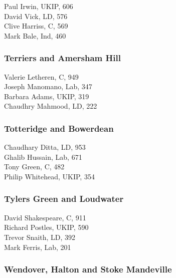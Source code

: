 \documentclass[a4paper,openany,10pt]{book}
\begin{document}


Paul Irwin, UKIP, 606\\
David Vick, LD, 576\\
Clive Harriss, C, 569\\
Mark Bale, Ind, 460\\


\subsubsection*{Terriers and Amersham Hill}



Valerie Letheren, C, 949\\
Joseph Manomano, Lab, 347\\
Barbara Adams, UKIP, 319\\
Chaudhry Mahmood, LD, 222\\


\subsubsection*{Totteridge and Bowerdean}



Chaudhary Ditta, LD, 953\\
Ghalib Hussain, Lab, 671\\
Tony Green, C, 482\\
Philip Whitehead, UKIP, 354\\


\subsubsection*{Tylers Green and Loudwater}



David Shakespeare, C, 911\\
Richard Postles, UKIP, 590\\
Trevor Snaith, LD, 392\\
Mark Ferris, Lab, 201\\


\subsubsection*{Wendover, Halton and Stoke Mandeville}
\end{document}
